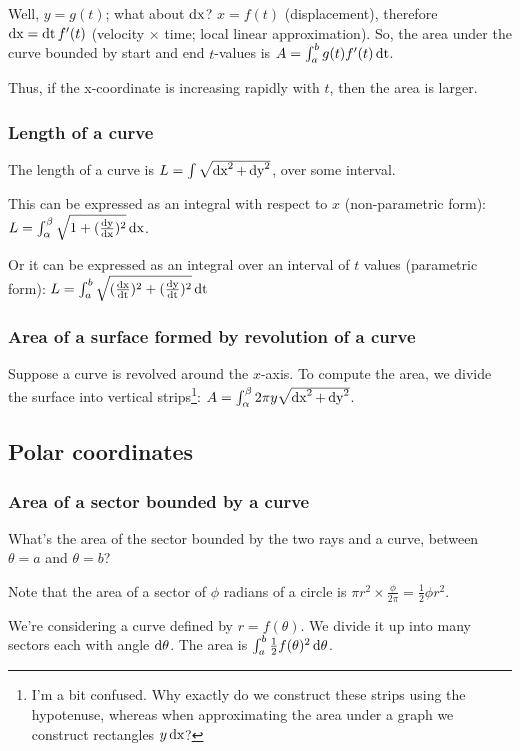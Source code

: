 \documentclass[12pt]{article}
\begin{document}
Well, $y = g(t)$; what about $\operatorname{\text{dx}}$? $x = f(t)$ (displacement), therefore
$\operatorname{\text{dx}} = \operatorname{\text{dt}} f'(t)$ (velocity $\times$ time; local linear approximation). So, the
area under the curve bounded by start and end $t$-values is
$A = \int_a^b g(t) f'(t) \operatorname{\text{dt}}$.

Thus, if the x-coordinate is increasing rapidly with $t$, then the area is
larger.

\subsubsection*{Length of a curve}

The length of a curve is $L = \int \sqrt{\operatorname{\text{dx}}^2 + \operatorname{\text{dy}}^2}$, over some interval.

This can be expressed as an integral with respect to $x$ (non-parametric form):
$L = \int_\alpha^\beta \sqrt{1 + (\frac{\operatorname{\text{dy}}}{\operatorname{\text{dx}}})^2} \operatorname{\text{dx}}$.

Or it can be expressed as an integral over an interval of $t$ values (parametric form):
$L = \int_a^b \sqrt{ (\frac{\operatorname{\text{dx}}}{\operatorname{\text{dt}}})^2 + (\frac{\operatorname{\text{dy}}}{\operatorname{\text{dt}}})^2} \operatorname{\text{dt}}$

\subsubsection*{Area of a surface formed by revolution of a curve}

Suppose a curve is revolved around the $x$-axis. To compute the area, we divide
the surface into vertical strips\footnote{I'm a bit confused. Why exactly do we
  construct these strips using the hypotenuse, whereas when approximating the
  area under a graph we construct rectangles $y\operatorname{\text{dx}}$?}:
$A = \int_\alpha^\beta 2\pi y \sqrt{\operatorname{\text{dx}}^2 + \operatorname{\text{dy}}^2}$.


\subsection*{Polar coordinates}


\subsubsection*{Area of a sector bounded by a curve}

What's the area of the sector bounded by the two rays and a curve, between $\theta=a$ and $\theta=b$?

Note that the area of a sector of $\phi$ radians of a circle is $\pi r^2 \times \frac{\phi}{2\pi} = \frac{1}{2}\phi r^2$.

We're considering a curve defined by $r = f(\theta)$. We divide it up into many
sectors each with angle $\operatorname{\text{d}\theta}$. The area is
$\int_a^b \frac{1}{2}f(\theta)^2\operatorname{\text{d}\theta}$.
\end{document}

